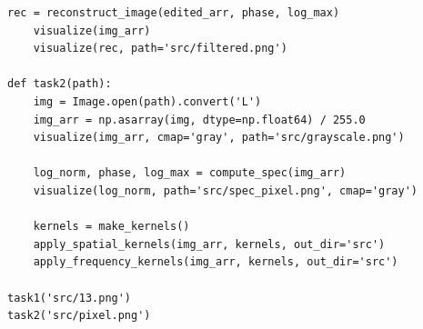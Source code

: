 \documentclass[a4paper]{article}
\begin{document}
\begin{lstlisting}[caption={Исходный код}]
    rec = reconstruct_image(edited_arr, phase, log_max)
    visualize(img_arr)
    visualize(rec, path='src/filtered.png')

def task2(path):
    img = Image.open(path).convert('L')
    img_arr = np.asarray(img, dtype=np.float64) / 255.0
    visualize(img_arr, cmap='gray', path='src/grayscale.png')

    log_norm, phase, log_max = compute_spec(img_arr)
    visualize(log_norm, path='src/spec_pixel.png', cmap='gray')

    kernels = make_kernels()
    apply_spatial_kernels(img_arr, kernels, out_dir='src')
    apply_frequency_kernels(img_arr, kernels, out_dir='src')

task1('src/13.png')
task2('src/pixel.png')
\end{lstlisting}
\end{document}
